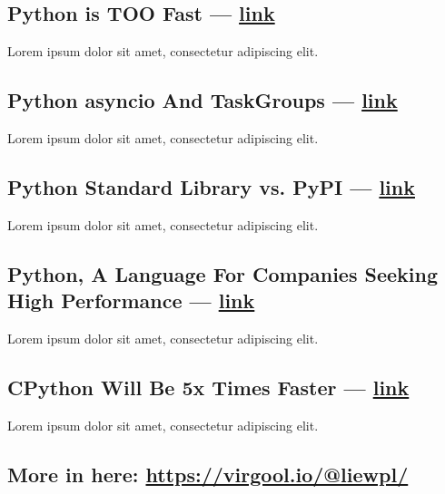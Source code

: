 \begin{multicols}{2}
\subsection{{Python is TOO Fast --- \href{https://virgool.io/@liewpl/python-is-very-fast-gmmdjs3zyhob}{link}}}
\begin{zitemize}
\item Lorem ipsum dolor sit amet, consectetur adipiscing elit.
\end{zitemize}

\subsection{{Python asyncio And TaskGroups --- \href{https://virgool.io/@liewpl/asyncio-and-taskgroups-t598c8poken9}{link}}}
\begin{zitemize}
\item Lorem ipsum dolor sit amet, consectetur adipiscing elit.
\end{zitemize}

\subsection{{Python Standard Library vs. PyPI --- \href{https://virgool.io/@liewpl/asyncio-and-taskgroups-t598c8poken9}{link}}}
\begin{zitemize}
\item Lorem ipsum dolor sit amet, consectetur adipiscing elit.
\end{zitemize}

\subsection{{Python, A Language For Companies Seeking High Performance --- \href{https://vrgl.ir/29p56}{link}}}
\begin{zitemize}
\item Lorem ipsum dolor sit amet, consectetur adipiscing elit.
\end{zitemize}

\subsection{{CPython Will Be 5x Times Faster --- \href{https://virgool.io/@liewpl/cpython-five-times-faster-p5jve4zzywog}{link}}}
\begin{zitemize}
\item Lorem ipsum dolor sit amet, consectetur adipiscing elit.
\end{zitemize}

\subsection{{More in here: \href{https://virgool.io/@liewpl/}{https://virgool.io/@liewpl/}}}

\end{multicols}